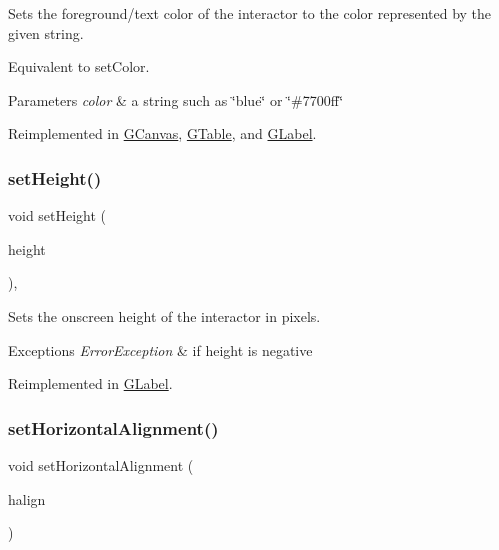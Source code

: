 Sets the foreground/text color of the interactor to the color represented by the given string. 

Equivalent to set\+Color. 
\begin{DoxyParams}{Parameters}
{\em color} & a string such as \char`\"{}blue\char`\"{} or \char`\"{}\#7700ff\char`\"{} \\
\hline
\end{DoxyParams}


Reimplemented in \mbox{\hyperlink{classGCanvas_a8afbcf1f47750fb4c717f9ff36540235}{G\+Canvas}}, \mbox{\hyperlink{classGTable_a8afbcf1f47750fb4c717f9ff36540235}{G\+Table}}, and \mbox{\hyperlink{classGLabel_a8afbcf1f47750fb4c717f9ff36540235}{G\+Label}}.

\mbox{\label{classGInteractor_a9e280bfc4544dfaf8e4376c4e1a74357}} 
\subsubsection{\texorpdfstring{set\+Height()}{setHeight()}}
{\footnotesize\ttfamily void set\+Height (\begin{DoxyParamCaption}\item[{double}]{height }\end{DoxyParamCaption})\hspace{0.3cm}{\ttfamily [virtual]}, {\ttfamily [inherited]}}



Sets the onscreen height of the interactor in pixels. 


\begin{DoxyExceptions}{Exceptions}
{\em Error\+Exception} & if height is negative \\
\hline
\end{DoxyExceptions}


Reimplemented in \mbox{\hyperlink{classGLabel_a5eead864d1249c4406f32f9944ed1503}{G\+Label}}.

\mbox{\label{classGContainer_a901653aacb9991ee9a8b70d4a932f0c9}} 
\subsubsection{\texorpdfstring{set\+Horizontal\+Alignment()}{setHorizontalAlignment()}}
{\footnotesize\ttfamily void set\+Horizontal\+Alignment (\begin{DoxyParamCaption}\item[{Horizontal\+Alignment}]{halign }\end{DoxyParamCaption})\hspace{0.3cm}{\ttfamily [virtual]}}



